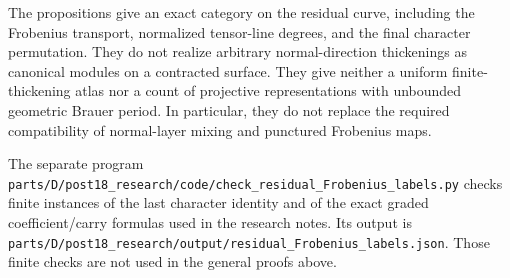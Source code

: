 \begin{remark}
The propositions give an exact category on the residual curve,
including the Frobenius transport, normalized tensor-line degrees,
and the final character permutation. They do not realize arbitrary
normal-direction thickenings as canonical modules on a contracted
surface. They give neither a uniform finite-thickening atlas nor a
count of projective representations with unbounded geometric
Brauer period. In particular, they do not replace the required
compatibility of normal-layer mixing and punctured Frobenius maps.

The separate program
\nolinkurl{parts/D/post18_research/code/check_residual_Frobenius_labels.py}
checks finite instances of the last character identity and of
the exact graded coefficient/carry formulas used in the research
notes. Its output is
\nolinkurl{parts/D/post18_research/output/residual_Frobenius_labels.json}.
Those finite checks are not used in the general proofs above.
\end{remark}
